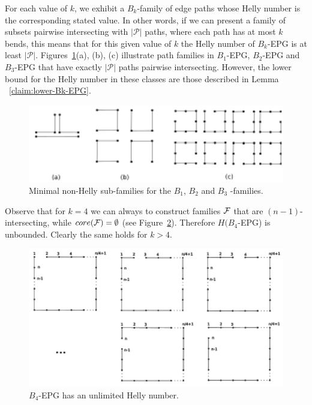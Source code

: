 For each value of $k$, we exhibit a $B_k$-family of edge paths whose Helly number is the corresponding stated value. In other words, if we can present a family of subsets pairwise intersecting  with $|\mathcal{P}|$ paths, where each path has at most $k$ bends, this means that for this given value of $ k $ the Helly number of $B_k$-EPG is at least $ |\mathcal{P}|$. Figures~\ref{fig:lowerBoundBkEPG1}(a), (b), (c) illustrate path families in $B_1$-EPG, $B_2$-EPG and $B_3$-EPG that have exactly $ |\mathcal{P}|$ paths pairwise intersecting. However, the lower bound for the Helly number in these classes are those described in Lemma
~\ref{claim:lower-Bk-EPG}.

\begin{figure}[!h]
\begin{center}
\includegraphics[width=12cm]{./img/b1epgSub.pdf}
\end{center}
\caption{Minimal non-Helly sub-families for the $B_1$, $B_2$ and $B_3$ -families.}
\label{fig:lowerBoundBkEPG1}
\end{figure}

Observe that for $k=4$ we can always to construct families $\cal{F}$ that are $(n-1)$-intersecting, while $core({\cal{F}})=\emptyset$ (see Figure~\ref{fig:lowerBoundB4EPG}). Therefore $H(B_4$-EPG) is unbounded. Clearly the same holds for $k >4$. 

\begin{figure}[!h]
\begin{center}
\includegraphics[width=12.5cm]{./img/b4epg.pdf}
\end{center}
\caption{$B_4$-EPG has an unlimited Helly number.}
\label{fig:lowerBoundB4EPG}
\end{figure}

